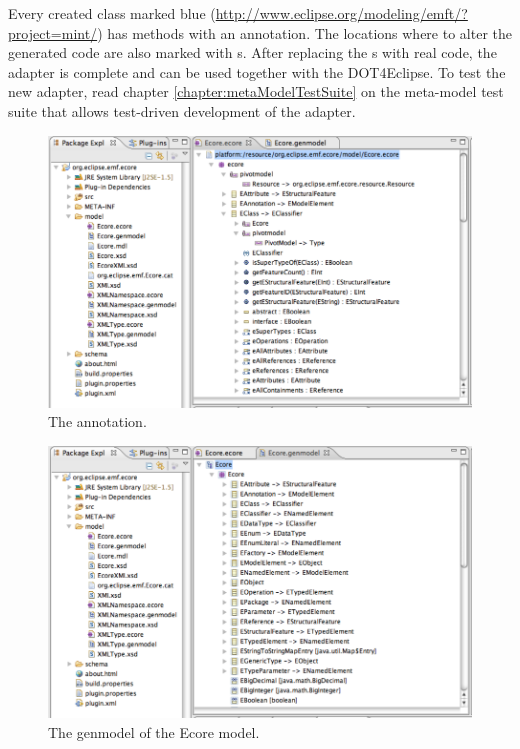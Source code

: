 Every created class marked blue (\url{http://www.eclipse.org/modeling/emft/?project=mint/}) has methods with an  annotation. The locations where to alter the generated code are also marked with s. After replacing the s with real code, the adapter is complete and can be used together with the \acl{DOT4Eclipse}. To test the new adapter, read chapter \ref{chapter:metaModelTestSuite} on the meta-model test suite that allows test-driven development of the adapter.

\begin{figure}[!htbp]
	\centering
	\includegraphics[width=1.0\linewidth]{figures/pivotModelAdaption/EClassAnnotation}
	\caption{The  annotation.}
	\label{pic:pivotModelAdaption:EClassAnnotation}
\end{figure}

\begin{figure}[!htbp]
	\centering
	\includegraphics[width=1.0\linewidth]{figures/pivotModelAdaption/EcoreGenModel}
	\caption{The genmodel of the Ecore model.}
	\label{pic:pivotModelAdaption:EcoreGenModel}
\end{figure}

